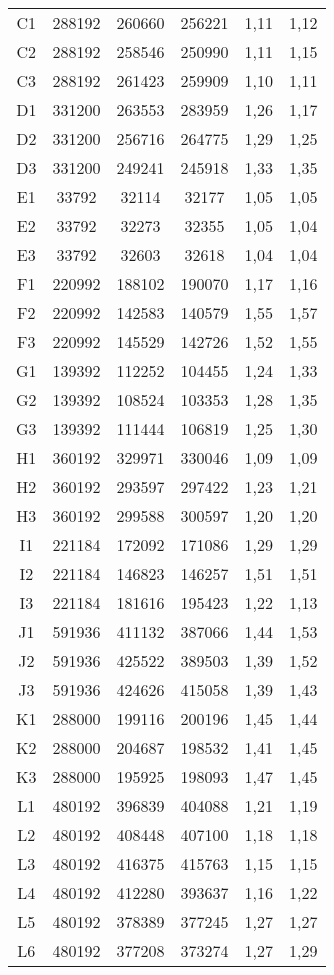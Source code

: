 \begin{center}
\begin{longtable}{cccccc}
    C1    & 288192 & 260660 & 256221 & 1,11  & 1,12 \\
    C2    & 288192 & 258546 & 250990 & 1,11  & 1,15 \\
    C3    & 288192 & 261423 & 259909 & 1,10  & 1,11 \\
    D1    & 331200 & 263553 & 283959 & 1,26  & 1,17 \\
    D2    & 331200 & 256716 & 264775 & 1,29  & 1,25 \\
    D3    & 331200 & 249241 & 245918 & 1,33  & 1,35 \\
    E1    & 33792 & 32114 & 32177 & 1,05  & 1,05 \\
    E2    & 33792 & 32273 & 32355 & 1,05  & 1,04 \\
    E3    & 33792 & 32603 & 32618 & 1,04  & 1,04 \\
    F1    & 220992 & 188102 & 190070 & 1,17  & 1,16 \\
    F2    & 220992 & 142583 & 140579 & 1,55  & 1,57 \\
    F3    & 220992 & 145529 & 142726 & 1,52  & 1,55 \\
    G1    & 139392 & 112252 & 104455 & 1,24  & 1,33 \\
    G2    & 139392 & 108524 & 103353 & 1,28  & 1,35 \\
    G3    & 139392 & 111444 & 106819 & 1,25  & 1,30 \\
    H1    & 360192 & 329971 & 330046 & 1,09  & 1,09 \\
    H2    & 360192 & 293597 & 297422 & 1,23  & 1,21 \\
    H3    & 360192 & 299588 & 300597 & 1,20  & 1,20 \\
    I1    & 221184 & 172092 & 171086 & 1,29  & 1,29 \\
    I2    & 221184 & 146823 & 146257 & 1,51  & 1,51 \\
    I3    & 221184 & 181616 & 195423 & 1,22  & 1,13 \\
    J1    & 591936 & 411132 & 387066 & 1,44  & 1,53 \\
    J2    & 591936 & 425522 & 389503 & 1,39  & 1,52 \\
    J3    & 591936 & 424626 & 415058 & 1,39  & 1,43 \\
    K1    & 288000 & 199116 & 200196 & 1,45  & 1,44 \\
    K2    & 288000 & 204687 & 198532 & 1,41  & 1,45 \\
    K3    & 288000 & 195925 & 198093 & 1,47  & 1,45 \\
    L1    & 480192 & 396839 & 404088 & 1,21  & 1,19 \\
    L2    & 480192 & 408448 & 407100 & 1,18  & 1,18 \\
    L3    & 480192 & 416375 & 415763 & 1,15  & 1,15 \\
    L4    & 480192 & 412280 & 393637 & 1,16  & 1,22 \\
    L5    & 480192 & 378389 & 377245 & 1,27  & 1,27 \\
    L6    & 480192 & 377208 & 373274 & 1,27  & 1,29 \\

\end{longtable}
\end{center}

